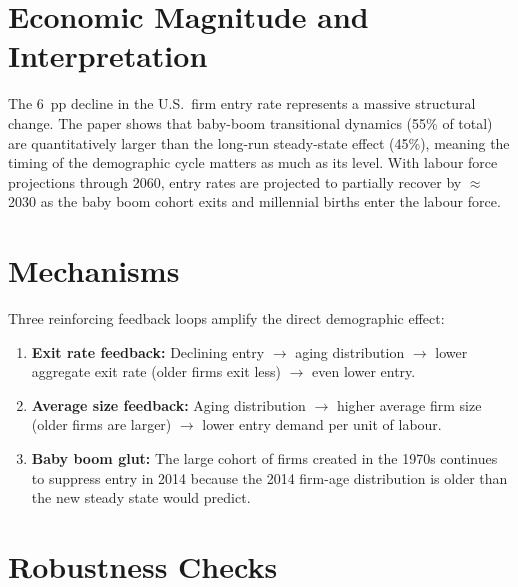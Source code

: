 \section{Economic Magnitude and Interpretation}

The 6~pp decline in the U.S.\ firm entry rate represents a massive
structural change. The paper shows that baby-boom transitional dynamics
(55\% of total) are quantitatively larger than the long-run steady-state
effect (45\%), meaning the timing of the demographic cycle matters as much
as its level. With labour force projections through 2060, entry rates are
projected to partially recover by $\approx$2030 as the baby boom cohort
exits and millennial births enter the labour force.

\section{Mechanisms}

Three reinforcing feedback loops amplify the direct demographic effect:
\begin{enumerate}
  \item \textbf{Exit rate feedback:} Declining entry $\to$ aging
    distribution $\to$ lower aggregate exit rate (older firms exit less)
    $\to$ even lower entry.
  \item \textbf{Average size feedback:} Aging distribution $\to$ higher
    average firm size (older firms are larger) $\to$ lower entry demand
    per unit of labour.
  \item \textbf{Baby boom glut:} The large cohort of firms created in the
    1970s continues to suppress entry in 2014 because the 2014 firm-age
    distribution is older than the new steady state would predict.
\end{enumerate}

\section{Robustness Checks}


